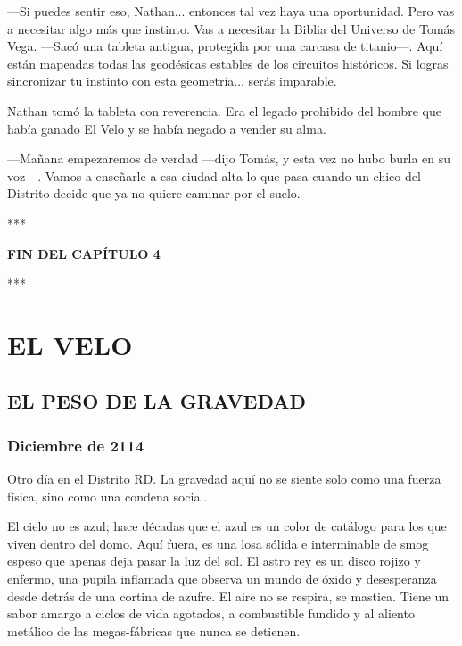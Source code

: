\documentclass[11pt,twoside]{book}
\begin{document}
---Si puedes sentir eso, Nathan... entonces tal vez haya una oportunidad. Pero vas a necesitar algo más que instinto. Vas a necesitar la Biblia del Universo de Tomás Vega. ---Sacó una tableta antigua, protegida por una carcasa de titanio---. Aquí están mapeadas todas las geodésicas estables de los circuitos históricos. Si logras sincronizar tu instinto con esta geometría... serás imparable.

Nathan tomó la tableta con reverencia. Era el legado prohibido del hombre que había ganado El Velo y se había negado a vender su alma.

---Mañana empezaremos de verdad ---dijo Tomás, y esta vez no hubo burla en su voz---. Vamos a enseñarle a esa ciudad alta lo que pasa cuando un chico del Distrito decide que ya no quiere caminar por el suelo.

\bigskip
\begin{center}***\end{center}
\bigskip

\textbf{FIN DEL CAPÍTULO 4}


\bigskip
\begin{center}***\end{center}
\bigskip


\part{EL VELO}

\chapter{EL PESO DE LA GRAVEDAD}

\section*{Diciembre de 2114}

Otro día en el Distrito RD. La gravedad aquí no se siente solo como una fuerza física, sino como una condena social.

El cielo no es azul; hace décadas que el azul es un color de catálogo para los que viven dentro del domo. Aquí fuera, es una losa sólida e interminable de smog espeso que apenas deja pasar la luz del sol. El astro rey es un disco rojizo y enfermo, una pupila inflamada que observa un mundo de óxido y desesperanza desde detrás de una cortina de azufre. El aire no se respira, se mastica. Tiene un sabor amargo a ciclos de vida agotados, a combustible fundido y al aliento metálico de las megas-fábricas que nunca se detienen.
\end{document}
